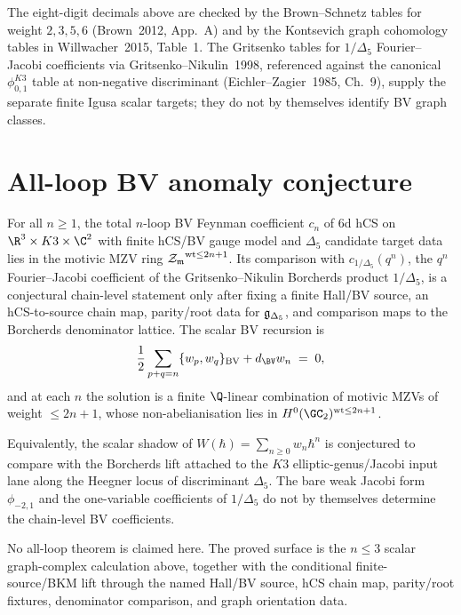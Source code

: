 The eight-digit decimals above are checked by the Brown--Schnetz tables
for weight $2, 3, 5, 6$ (Brown~2012, App.~A) and by the Kontsevich graph
cohomology tables in Willwacher~2015, Table~1. The Gritsenko tables for
$1/\Delta_5$ Fourier--Jacobi coefficients via Gritsenko--Nikulin~1998,
referenced against the canonical \(\phi_{0,1}^{K3}\) table at
non-negative discriminant (Eichler--Zagier~1985, Ch.~9), supply the separate finite
Igusa scalar targets; they do not by themselves identify BV graph
classes.

\section{All-loop BV anomaly conjecture}
\label{sec:general-n-loop}

\begin{conjecture}
\label{conj:all-loop-bv-anomaly}
For all $n\geq 1$, the total $n$-loop BV Feynman coefficient
$c_n$ of 6d hCS on $\R^3\times K3\times\C^2$ with finite hCS/BV gauge
model and $\Delta_5$ candidate target data lies in the motivic MZV ring
${\mathcal{Z}_{\mathfrak m}}^{\mathrm{wt}\leq 2n+1}$. Its comparison with
$c_{1/\Delta_5}(q^n)$, the $q^{n}$ Fourier--Jacobi coefficient of the
Gritsenko--Nikulin Borcherds product $1/\Delta_5$, is a conjectural
chain-level statement only after fixing a finite Hall/BV source,
an hCS-to-source chain map, parity/root data for $\mathfrak{g}_{\Delta_5}$,
and comparison maps to the Borcherds denominator lattice. The scalar
BV recursion is
\[
\frac{1}{2}\sum_{p+q = n} \{w_p, w_q\}_{\mathrm{BV}}
+ d_{\BV} w_n \;=\; 0,
\]
and at each $n$ the solution is a finite $\Q$-linear combination of
motivic MZVs of weight $\leq 2n+1$, whose non-abelianisation lies in
$H^0(\GC_2)^{\mathrm{wt}\leq 2n+1}$.

Equivalently, the scalar shadow of
$W(\hbar) = \sum_{n\geq 0} w_n \hbar^n$ is conjectured to compare with the
Borcherds lift attached to the $K3$ elliptic-genus/Jacobi input lane
along the Heegner locus of discriminant $\Delta_5$. The bare weak
Jacobi form $\phi_{-2,1}$ and the one-variable coefficients of
$1/\Delta_5$ do not by themselves determine the chain-level BV
coefficients.
\end{conjecture}

No all-loop theorem is claimed here. The proved surface is the
$n\leq 3$ scalar graph-complex calculation above, together with the
conditional finite-source/BKM lift through the named Hall/BV source,
hCS chain map, parity/root fixtures, denominator comparison, and graph
orientation data.

